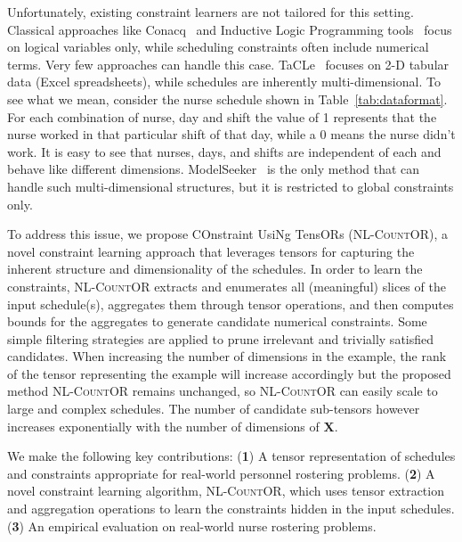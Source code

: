 \documentclass{article}
\newcommand{\stefano}[1]{{\bf \textcolor{violet}{{Stefano: #1}}}}
\newcommand{\learner}{\textsc{NL-CountOR}}
\newcommand{\TX}{\textbf{X}\xspace}
\begin{document}
Unfortunately, existing constraint learners are not tailored for this setting.  Classical approaches like Conacq~\cite{Bessiere} and Inductive Logic Programming tools~\cite{MUGGLETON1994629} focus on logical variables only,  while scheduling constraints often include numerical terms.  Very few approaches can handle this case.  TaCLe~\cite{kolb2017learning} focuses on 2-D tabular data (Excel spreadsheets), while schedules are inherently multi-dimensional. To see what we mean, consider the nurse schedule shown in Table~\ref{tab:dataformat}.  For each combination of nurse, day and shift the value of 1 represents that the nurse worked in that particular shift of that day, while a 0 means the nurse didn't work.  It is easy to see that nurses, days, and shifts are independent of each and behave like different dimensions.  ModelSeeker~\cite{beldiceanu2012model} is the only method that can handle such multi-dimensional structures, but it is restricted to global constraints only.


To address this issue, we propose COnstraint UsiNg TensORs (\learner{}), a novel constraint learning approach that leverages tensors for capturing the inherent structure and dimensionality of the schedules.  In order to learn the constraints, \learner{} extracts and enumerates all (meaningful) slices of the input schedule(s), aggregates them through tensor operations, and then computes bounds for the aggregates to generate candidate numerical constraints.  Some simple filtering strategies are applied to prune irrelevant and trivially satisfied candidates.  When increasing the number of dimensions in the example, the rank of the tensor representing the example will increase accordingly but the proposed method \learner{} remains unchanged, so \learner{} can easily scale to large and complex schedules. The number of candidate sub-tensors however increases exponentially with the number of dimensions of $\TX$.

We make the following key contributions:
%
(\textbf{1}) A tensor representation of schedules and constraints appropriate for real-world personnel rostering problems.
%
(\textbf{2}) A novel constraint learning algorithm, \learner{}, which uses tensor extraction and aggregation operations to learn the constraints hidden in the input schedules.
%
(\textbf{3}) An empirical evaluation on real-world nurse rostering problems.
%
\end{document}
